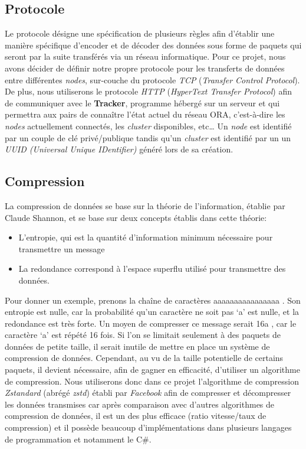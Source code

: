 \documentclass[11pt, a4paper]{specifications}
\begin{document}
\clearpage

    \subsection{Protocole}
Le protocole désigne une spécification de plusieurs règles afin d'établir une manière spécifique d'encoder et de décoder des données sous forme de paquets qui seront par la suite transférés via un réseau informatique. Pour ce projet, nous avons décider de définir notre propre protocole pour les transferts de données entre différentes \textit{nodes}, sur-couche du protocole \textit{TCP} (\textit{Transfer Control Protocol}). De plus, nous utiliserons le protocole \textit{HTTP} (\textit{HyperText Transfer Protocol}) afin de communiquer avec le \textbf{Tracker}, programme hébergé sur un serveur et qui permettra aux pairs de connaître l'état actuel du réseau ORA, c'est-à-dire les \textit{nodes} actuellement connectés, les \textit{cluster} disponibles, etc\ldots \newline
Un \textit{node} est identifié par un couple de clé privé/publique tandis qu'un \textit{cluster} est identifié par un un \textit{UUID (Universal Unique IDentifier)} généré lors de sa création.

    \subsection{Compression}
La compression de données se base sur la théorie de l’information, établie par Claude Shannon, et se base sur deux concepts établis dans cette théorie:
\begin{itemize}
  \item L’entropie, qui est la quantité d’information minimum nécessaire pour transmettre un message 
  \item La redondance correspond à l’espace superflu utilisé pour transmettre des données.
\end{itemize}
Pour donner un exemple, prenons la chaîne de caractères \og aaaaaaaaaaaaaaaa \fg. Son entropie est nulle, car la probabilité qu’un caractère ne soit pas ‘a’ est nulle, et la redondance est très forte. Un moyen de compresser ce message serait \og 16a \fg, car le caractère ‘a’ est répété 16 fois.
Si l’on se limitait seulement à des paquets de données de petite taille, il serait inutile de mettre en place un système de compression de données. Cependant, au vu de la taille potentielle de certains paquets, il devient nécessaire, afin de gagner en efficacité, d’utiliser un algorithme de compression. Nous utiliserons donc dans ce projet l’algorithme de compression \textit{Zstandard} (abrégé \textit{zstd}) établi par \textit{Facebook} afin de compresser et décompresser les données transmises car après comparaison avec d'autres algorithmes de compression de données, il est un des plus efficace (ratio vitesse/taux de compression) et il possède beaucoup d'implémentations dans plusieurs langages de programmation et notamment le C\#.
\end{document}
